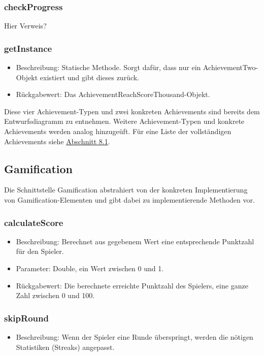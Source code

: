 \documentclass[a4paper]{scrreprt}
\begin{document}
	\subsubsection{checkProgress}
	Hier Verweis?
	\subsubsection{getInstance}
	\begin{itemize}
		\item Beschreibung: Statische Methode. Sorgt dafür, dass nur ein AchievementTwo-Objekt existiert und gibt dieses zurück.
		\item Rückgabewert: Das AchievementReachScoreThousand-Objekt.
	\end{itemize}

	\vspace{8pt}

	Diese vier Achievement-Typen und zwei konkreten Achievements sind bereits dem Entwurfsdiagramm zu entnehmen. Weitere Achievement-Typen und konkrete Achievements werden analog hinzugeüft. Für eine Liste der vollständigen Achievements siehe \hyperlink{Ach}{Abschnitt 8.1}. \\

	\vspace{8pt}


	\subsection{Gamification}
	Die Schnittstelle Gamification abstrahiert von der konkreten Implementierung von Gamification-Elementen und gibt dabei zu implementierende Methoden vor. \\

	\subsubsection{calculateScore}
	\begin{itemize}
		\item Beschreibung: Berechnet aus gegebenem Wert eine entsprechende Punktzahl für den Spieler.
		\item Parameter: Double, ein Wert zwischen 0 und 1.
		\item Rückgabewert: Die berechnete erreichte Punktzahl des Spielers, eine ganze Zahl zwischen 0 und 100.
	\end{itemize}
	\subsubsection{skipRound}
	\begin{itemize}
		\item Beschreibung: Wenn der Spieler eine Runde überspringt, werden die nötigen Statistiken (Streaks) angepasst.
	\end{itemize}
\end{document}
